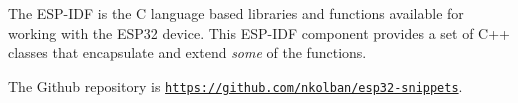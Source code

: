 The E\+S\+P-\/\+I\+DF is the C language based libraries and functions available for working with the E\+S\+P32 device. This E\+S\+P-\/\+I\+DF component provides a set of C++ classes that encapsulate and extend {\itshape some} of the functions.

The Github repository is \href{https://github.com/nkolban/esp32-snippets}{\tt https\+://github.\+com/nkolban/esp32-\/snippets}. 